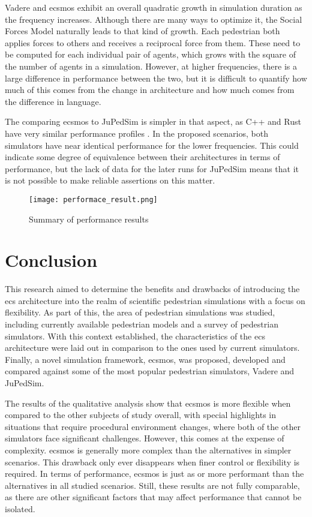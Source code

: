 \documentclass[twoside, 11pt]{article}
\begin{document}
Vadere and \gls{ecsmos} exhibit an overall quadratic growth in simulation duration as the frequency increases. Although there are many ways to optimize it, the Social Forces Model naturally leads to that kind of growth. Each pedestrian both applies forces to others and receives a reciprocal force from them. These need to be computed for each individual pair of agents, which grows with the square of the number of agents in a simulation. However, at higher frequencies, there is a large difference in performance between the two, but it is difficult to quantify how much of this comes from the change in architecture and how much comes from the difference in language. 

The comparing \gls{ecsmos} to JuPedSim is simpler in that aspect, as C++ and Rust have very similar performance profiles \cite{electronics12010143}. In the proposed scenarios, both simulators have near identical performance for the lower frequencies. This could indicate some degree of equivalence between their architectures in terms of performance, but the lack of data for the later runs for JuPedSim means that it is not possible to make reliable assertions on this matter.

\begin{figure}
  \centering
  \texttt{[image: performace\_result.png]}
  \caption[Summary of performance results]{Summary of performance results}
  \label{fig:performace-results}
\end{figure}

\section{Conclusion} \label{sec:conclusion}

This research aimed to determine the benefits and drawbacks of introducing the \gls{ecs} architecture into the realm of scientific pedestrian simulations with a focus on flexibility. As part of this, the area of pedestrian simulations was studied, including currently available pedestrian models and a survey of pedestrian simulators. With this context established, the characteristics of the \gls{ecs} architecture were laid out in comparison to the ones used by current simulators. Finally, a novel simulation framework, \gls{ecsmos}, was proposed, developed and compared against some of the most popular pedestrian simulators, Vadere and JuPedSim.

The results of the qualitative analysis show that \gls{ecsmos} is more flexible when compared to the other subjects of study overall, with special highlights in situations that require procedural environment changes, where both of the other simulators face significant challenges. However, this comes at the expense of complexity. \gls{ecsmos} is generally more complex than the alternatives in simpler scenarios. This drawback only ever disappears when finer control or flexibility is required. In terms of performance, \gls{ecsmos} is just as or more performant than the alternatives in all studied scenarios. Still, these results are not fully comparable, as there are other significant factors that may affect performance that cannot be isolated.
\end{document}
